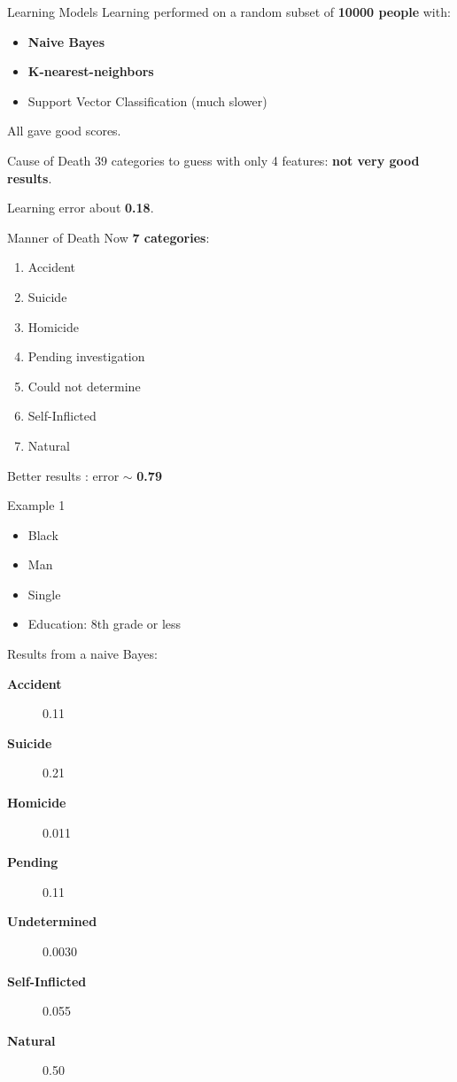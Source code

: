 \documentclass[xcolor=table]{beamer}
\begin{document}
\begin{frame}{Learning Models}
  Learning performed on a random subset of \textbf{10000 people} with:
  \begin{itemize}
    \item \textbf{Naive Bayes}
    \item \textbf{K-nearest-neighbors}
    \item Support Vector Classification (much slower)
  \end{itemize}
  
  \bigskip
  
  All gave good scores.
\end{frame}


\begin{frame}{Cause of Death}
  39 categories to guess with only 4 features: \textbf{not very good results}.
  
  \bigskip
  
  Learning error about \textbf{0.18}.
\end{frame}

\begin{frame}{Manner of Death}
  Now \textbf{7 categories}:
  \begin{enumerate}
    \item Accident
    \item Suicide
    \item Homicide
    \item Pending investigation
    \item Could not determine
    \item Self-Inflicted
    \item Natural
  \end{enumerate}
  
  \bigskip
  
  Better results : error $\sim$ \textbf{0.79}
\end{frame}

\begin{frame}{Example 1}
  \begin{itemize}
    \item Black
    \item Man
    \item Single
    \item Education: 8th grade or less
  \end{itemize}
  
  Results from a naive Bayes:
  \begin{description}
    \item [\textbf{Accident}] 0.11
    \item [\textbf{Suicide}] 0.21
    \item [\textbf{Homicide}] 0.011
    \item [\textbf{Pending}] 0.11
    \item [\textbf{Undetermined}] 0.0030
    \item [\textbf{Self-Inflicted}] 0.055
    \item [\textbf{Natural}] 0.50
  \end{description}
\end{frame}
\end{document}
